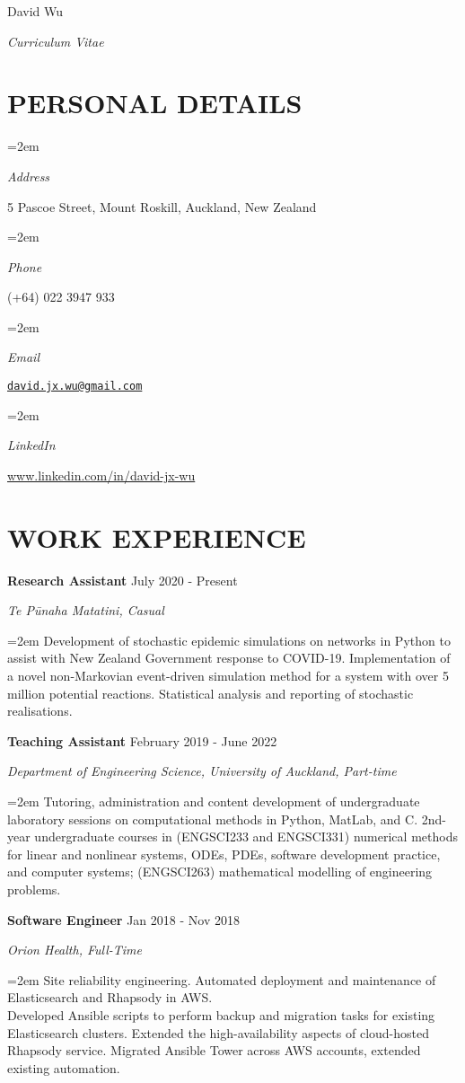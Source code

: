 \documentclass[paper=a4paper,fontsize=11pt]{scrartcl} %
\newlength{\spacebox}
\newcommand{\MyName}[1]{ %
		\Huge \usefont{T1}{phv}{b}{n} \hfill #1
		\par \normalsize \normalfont}
\newcommand{\MySlogan}[1]{ %
		\large \usefont{T1}{phv}{m}{n}\hfill \textit{#1}
		\par \normalsize \normalfont}
\newcommand{\NewPart}[1]{\section*{\uppercase{#1}}}
\newcommand{\PersonalEntry}[2]{
		\noindent\hangindent=2em\hangafter=0 %
		\parbox{\spacebox}{        %
		\textit{#1}}		       %
		\hspace{1.5em} #2 \par}    %
\newcommand{\EducationEntry}[4]{
		\noindent \textbf{#1} \hfill      %
		{#2} \par  %
		\noindent \textit{#3} \par        %
		\noindent\hangindent=2em\hangafter=0 \small #4 %
		\normalsize \par\par}
\newcommand{\WorkEntry}[4]{				  %
		\noindent \textbf{#1} \hfill      %
		{#2} \par  %
		\noindent \textit{#3} \par              %
		\noindent\hangindent=2em\hangafter=0 \small #4 %
		\normalsize \par\par}
\begin{document}
\vspace*{-1cm}
\MyName{David Wu}
\MySlogan{Curriculum Vitae}

\NewPart{Personal Details}

\PersonalEntry{Address}{5 Pascoe Street, Mount Roskill, Auckland, New Zealand}
\PersonalEntry{Phone}{(+64) 022 3947 933}
\PersonalEntry{Email}{\href{mailto:david.jx.wu@gmail.com}{\texttt{david.jx.wu@gmail.com}}}
\PersonalEntry{LinkedIn}{\url{www.linkedin.com/in/david-jx-wu}}

\NewPart{Work experience}

\WorkEntry{Research Assistant}{July 2020 - Present}{Te P\={u}naha Matatini, Casual}{Development of stochastic epidemic simulations on networks in Python to assist with New Zealand Government response to COVID-19. Implementation of a novel non-Markovian event-driven simulation method for a system with over 5 million potential reactions. Statistical analysis and reporting of stochastic realisations.}

\WorkEntry{Teaching Assistant}{February 2019 - June 2022}{Department of Engineering Science, University of Auckland, Part-time}{Tutoring, administration and content development of undergraduate laboratory sessions on computational methods in Python, MatLab, and C. 2nd-year undergraduate courses in (ENGSCI233 and ENGSCI331) numerical methods for linear and nonlinear systems, ODEs, PDEs, software development practice, and computer systems; (ENGSCI263) mathematical modelling of engineering problems.}

\WorkEntry{Software Engineer}{Jan 2018 - Nov 2018}{Orion Health, Full-Time}{Site reliability engineering. Automated deployment and maintenance of Elasticsearch and Rhapsody in AWS. \\Developed Ansible scripts to perform backup and migration tasks for existing Elasticsearch clusters. Extended the high-availability aspects of cloud-hosted Rhapsody service. Migrated Ansible Tower across AWS accounts, extended existing automation.}

\end{document}
